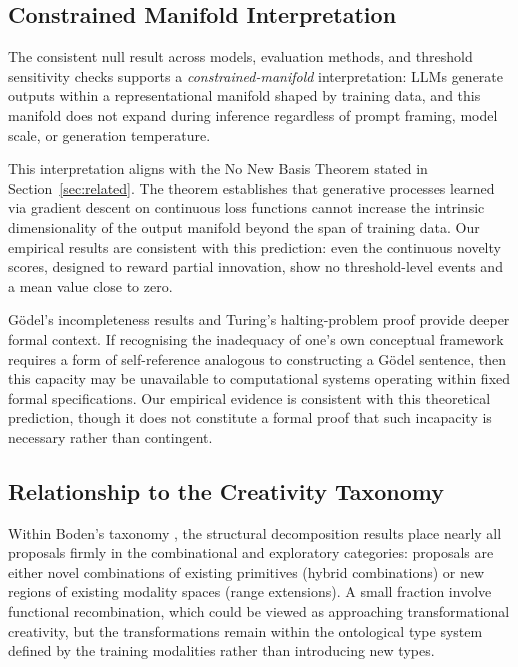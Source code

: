 \documentclass[pdflatex,sn-mathphys-num]{sn-jnl}
\begin{document}
\subsection{Constrained Manifold Interpretation}

The consistent null result across models, evaluation methods, and threshold sensitivity checks
supports a \emph{constrained-manifold} interpretation: LLMs generate outputs within a
representational manifold shaped by training data, and this manifold does not expand during
inference regardless of prompt framing, model scale, or generation temperature.

This interpretation aligns with the No New Basis Theorem stated in Section~\ref{sec:related}.
The theorem establishes that generative processes learned via gradient descent on continuous loss
functions cannot increase the intrinsic dimensionality of the output manifold beyond the span of
training data.  Our empirical results are consistent with this prediction: even the continuous
novelty scores, designed to reward partial innovation, show no threshold-level events and a mean
value close to zero.

G\"{o}del's incompleteness results \cite{godel1931formal} and Turing's halting-problem proof
\cite{turing1936computable} provide deeper formal context.  If recognising the inadequacy of
one's own conceptual framework requires a form of self-reference analogous to constructing
a G\"{o}del sentence, then this capacity may be unavailable to computational systems operating
within fixed formal specifications.  Our empirical evidence is consistent with this theoretical
prediction, though it does not constitute a formal proof that such incapacity is necessary rather
than contingent.

\subsection{Relationship to the Creativity Taxonomy}

Within Boden's taxonomy \cite{boden2004creative}, the structural decomposition results place
nearly all proposals firmly in the combinational and exploratory categories: proposals are either
novel combinations of existing primitives (hybrid combinations) or new regions of existing
modality spaces (range extensions).  A small fraction involve functional recombination, which
could be viewed as approaching transformational creativity, but the transformations remain within
the ontological type system defined by the training modalities rather than introducing new types.
\end{document}
